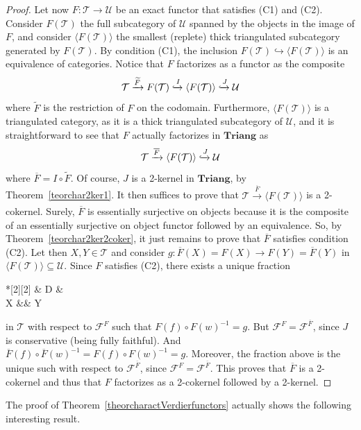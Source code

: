 \documentclass[11pt,reqno,a4paper]{amsart}
\theoremstyle{definition}
\theoremstyle{remark}
\def\nameit#1{\textrm{#1}~}
\def\thex{\nameit{Theorem}}
\newcommand{\T}{\mathcal{T}}
\newcommand{\U}{\mathcal{U}}
\newcommand{\F}{\mathcal{F}}
\newcommand{\0}{\mathbf{0}}
\renewcommand{\1}{\mathbf{1}}
\newcommand{\Triang}{\mathbf{Triang}}
\def\:{\colon}
\def\c{\circ}
\newcommand{\aar}[2][]{\xrightarrow[#1]{#2}}
\begin{document}
\begin{proof}
    Let now $F\: \T \to \U$ be an exact functor that satisfies (C1) and (C2). Consider $F(\T)$ the full subcategory of $\U$ spanned by the objects in the image of $F$, and consider $\langle F(\T) \rangle$ the smallest (replete) thick triangulated subcategory generated by $F(\T)$. By condition (C1), the inclusion $F(\T)\hookrightarrow \langle F(\T) \rangle$ is an equivalence of categories. Notice that $F$ factorizes as a functor as the composite
    $$\T \aar{\widetilde{F}} F(\T) \xhookrightarrow{I}\langle F(\T)\rangle \xhookrightarrow{J} \U$$
    where $\widetilde{F}$ is the restriction of $F$ on the codomain. Furthermore, $\langle F(\T)\rangle$ is a triangulated category, as it is a thick triangulated subcategory of $\U$, and it is straightforward to see that $F$ actually factorizes in $\Triang$ as
    $$\T \aar{\overline{F}} \langle F(\T)\rangle \xhookrightarrow{J} \U$$
    where $\overline{F}=I\c \widetilde{F}$. Of course, $J$ is a 2-kernel in $\Triang$, by \thex\ref{teorchar2ker1}. It then suffices to prove that $\T \aar{\overline{F}} \langle F(\T) \rangle$ is a 2-cokernel. Surely, $\overline{F}$ is essentially surjective on objects because it is the composite of an essentially surjective on object functor followed by an equivalence. So, by \thex \ref{teorchar2ker2coker}, it just remains to prove that $\overline{F}$ satisfies condition (C2). Let then $X,Y\in \T$ and consider $g\: \overline{F}(X)=F(X) \to F(Y)=\overline{F}(Y)$ in $\langle F(\T) \rangle\subseteq \U$. Since $F$ satisfies (C2), there exists a unique fraction  \begin{cd}*[2][2] \& D \& \\[-2ex]
	X \&\& Y
	\arrow["w"', from=1-2, to=2-1]
	\arrow["f", from=1-2, to=2-3]\end{cd} in $\T$ with respect to $\F^{F}$ such that $F(f)\c F(w)^{-1}=g$. But $\F^{F}=\F^{\overline{F}}$, since $J$ is conservative (being fully faithful). And $\overline{F}(f)\c \overline{F}(w)^{-1}=F(f)\c F(w)^{-1}=g$. Moreover, the fraction above is the unique such with respect to $\mathcal{F}^{\overline{F}}$, since $\F^{F}=\F^{\overline{F}}$. This proves that $\overline{F}$ is a 2-cokernel and thus that $F$ factorizes as a 2-cokernel followed by a 2-kernel.
    \end{proof}

The proof of \thex \ref{theorcharactVerdierfunctors} actually shows the following interesting result.
\end{document}
